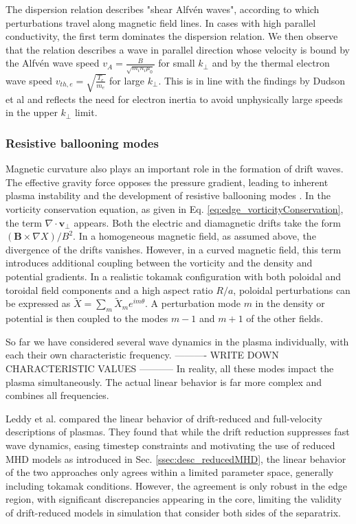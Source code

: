 The dispersion relation describes "shear Alfvén waves", according to which perturbations travel along magnetic field lines. In cases with high parallel conductivity, the first term dominates the dispersion relation. We then observe that the relation describes a wave in parallel direction whose velocity is bound by the Alfvén wave speed $v_A = \frac{B}{\sqrt{m_in_i\mu_0}}$ for small $k_\perp$ and by the thermal electron wave speed $v_ {th,e} = \sqrt{\frac{T_e}{m_e}}$ for large $k_\perp$. This is in line with the findings by Dudson et al \cite{Dudson2021} and reflects the need for electron inertia to avoid unphysically large speeds in the upper $k_\perp$ limit.  

\subsubsection{Resistive ballooning modes}

Magnetic curvature also plays an important role in the formation of drift waves. The effective gravity force opposes the pressure gradient, leading to inherent plasma instability and the development of resistive ballooning modes \cite{hastie2003drift}. In the vorticity conservation equation, as given in Eq. \ref{eq:edge_vorticityConservation}, the term $ \nabla \cdot \mathbf{v}_\perp $ appears. Both the electric and diamagnetic drifts take the form $ ( \mathbf{B} \times \nabla X)/B^2 $. In a homogeneous magnetic field, as assumed above, the divergence of the drifts vanishes. However, in a curved magnetic field, this term introduces additional coupling between the vorticity and the density and potential gradients. In a realistic tokamak configuration with both poloidal and toroidal field components and a high aspect ratio $ R/a $, poloidal perturbations can be expressed as $ \tilde{X} = \sum_m \tilde{X}_m e^{im\theta} $. A perturbation mode $ m $ in the density or potential is then coupled to the modes $ m-1 $ and $ m+1 $ of the other fields. \newline 

So far we have considered several wave dynamics in the plasma individually, with each their own characteristic frequency. 
---------- WRITE DOWN CHARACTERISTIC VALUES ----------- 
In reality, all these modes impact the plasma simultaneously. The actual linear behavior is far more complex and combines all frequencies. 

Leddy et al. \cite{leddy2015validity} compared the linear behavior of drift-reduced and full-velocity descriptions of plasmas. They found that while the drift reduction suppresses fast wave dynamics, easing timestep constraints and motivating the use of reduced MHD models as introduced in Sec. \ref{ssec:desc_reducedMHD}, the linear behavior of the two approaches only agrees within a limited parameter space, generally including tokamak conditions. However, the agreement is only robust in the edge region, with significant discrepancies appearing in the core, limiting the validity of drift-reduced models in simulation that consider both sides of the separatrix.



